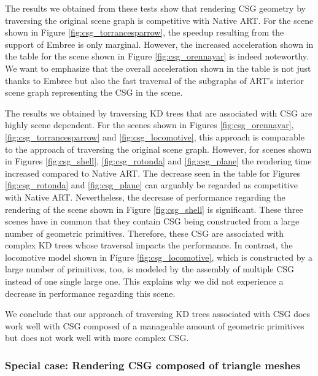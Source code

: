 The results we obtained from these tests show that rendering CSG geometry by traversing the original scene graph is competitive with Native ART. For the scene shown in Figure \ref{fig:csg_torrancesparrow}, the speedup resulting from the support of Embree is only marginal. However, the increased acceleration shown in the table for the scene shown in Figure \ref{fig:csg_orennayar} is indeed noteworthy. We want to emphasize that the overall acceleration shown in the table is not just thanks to Embree but also the fast traversal of the subgraphs of ART's interior scene graph representing the CSG in the scene.

The results we obtained by traversing KD trees that are associated with CSG are highly scene dependent. For the scenes shown in Figures \ref{fig:csg_orennayar}, \ref{fig:csg_torrancesparrow} and \ref{fig:csg_locomotive}, this approach is comparable to the approach of traversing the original scene graph. However, for scenes shown in Figures \ref{fig:csg_shell}, \ref{fig:csg_rotonda} and \ref{fig:csg_plane} the rendering time increased compared to Native ART. The decrease seen in the table for Figures \ref{fig:csg_rotonda} and \ref{fig:csg_plane} can arguably be regarded as competitive with Native ART. Nevertheless, the decrease of performance regarding the rendering of the scene shown in Figure \ref{fig:csg_shell} is significant. These three scenes have in common that they contain CSG being constructed from a large number of geometric primitives. Therefore, these CSG are associated with complex KD trees whose traversal impacts the performance. In contrast, the locomotive model shown in Figure \ref{fig:csg_locomotive}, which is constructed by a large number of primitives, too, is modeled by the assembly of multiple CSG instead of one single large one. This explains why we did not experience a decrease in performance regarding this scene.

We conclude that our approach of traversing KD trees associated with CSG does work well with CSG composed of a manageable amount of geometric primitives but does not work well with more complex CSG.

\subsubsection{Special case: Rendering CSG composed of triangle meshes}

